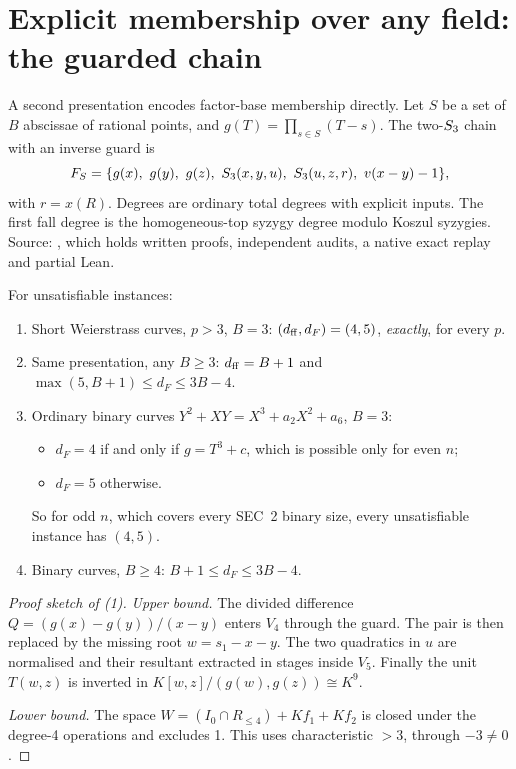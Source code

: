 \section{Explicit membership over any field: the guarded chain}\label{sec:fd-guarded}

A second presentation encodes factor-base membership directly. Let $S$ be
a set of $B$ abscissae of rational points, and $g(T)=\prod_{s\in S}(T-s)$.
The two-$S_{3}$ chain with an inverse guard is
\[
  F_S=\{g(x),\ g(y),\ g(z),\ \Sem3(x,y,u),\ \Sem3(u,z,r),\ v(x-y)-1\},
\]
with $r=x(R)$. Degrees are ordinary total degrees with explicit inputs.
The first fall degree is the homogeneous-top syzygy degree modulo Koszul
syzygies. Source: , which holds
written proofs, independent audits, a native exact replay and partial
Lean.

\begin{theorem}\label{thm:guarded}
For unsatisfiable instances:
\begin{enumerate}
\item Short Weierstrass curves, $p>3$, $B=3$:
  $(d_{\rm ff},d_F)=(4,5)$, \emph{exactly}, for every $p$.
\item Same presentation, any $B\ge3$: $d_{\rm ff}=B+1$ and
  $\max(5,B+1)\le d_F\le3B-4$.
\item Ordinary binary curves $Y^2+XY=X^3+a_2X^2+a_6$, $B=3$:
  \begin{itemize}
  \item $d_F=4$ if and only if $g=T^3+c$, which is possible only for even
    $n$;
  \item $d_F=5$ otherwise.
  \end{itemize}
  So for odd $n$, which covers every SEC~2 binary size, every
  unsatisfiable instance has $(4,5)$.
\item Binary curves, $B\ge4$: $B+1\le d_F\le3B-4$.
\end{enumerate}
\end{theorem}

\begin{proof}[Proof sketch of (1)]
\emph{Upper bound.} The divided difference
$Q=(g(x)-g(y))/(x-y)$ enters $V_4$ through the guard. The pair is then
replaced by the missing root $w=s_1-x-y$. The two quadratics in $u$ are
normalised and their resultant extracted in stages inside $V_5$. Finally
the unit $T(w,z)$ is inverted in $K[w,z]/(g(w),g(z))\cong K^9$.

\emph{Lower bound.} The space $W=(I_0\cap R_{\le4})+Kf_1+Kf_2$ is closed
under the degree-4 operations and excludes 1. This uses characteristic
$>3$, through $-3\ne0$.
\end{proof}

